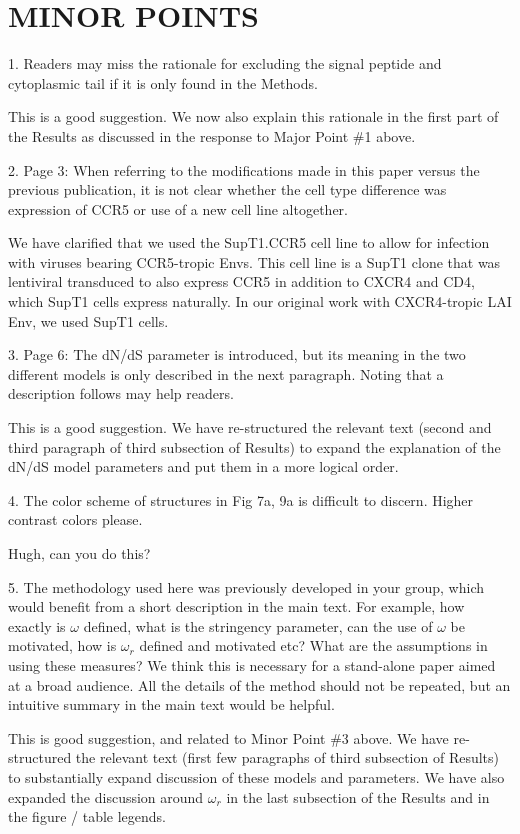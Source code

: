 \documentclass[11pt, oneside]{article}   	%
\begin{document}
\section*{MINOR POINTS}

1. Readers may miss the rationale for excluding the signal peptide and cytoplasmic tail if it is only found in the Methods. 

{\color{black}
This is a good suggestion.
We now also explain this rationale in the first part of the Results as discussed in the response to Major Point \#1 above.}

2. Page 3: When referring to the modifications made in this paper versus the previous publication, it is not clear whether the cell type difference was expression of CCR5 or use of a new cell line altogether. 

{\color{black}
We have clarified that we used the SupT1.CCR5 cell line to allow for infection with viruses bearing CCR5-tropic Envs. This cell line is a SupT1 clone that was lentiviral transduced to also express CCR5 in addition to CXCR4 and CD4, which SupT1 cells express naturally. In our original work with CXCR4-tropic LAI Env, we used SupT1 cells. 
}

3. Page 6: The dN/dS parameter is introduced, but its meaning in the two different models is only described in the next paragraph. Noting that a description follows may help readers. 

{\color{black}
This is a good suggestion.
We have re-structured the relevant text (second and third paragraph of third subsection of Results) to expand the explanation of the dN/dS model parameters and put them in a more logical order.}

4. The color scheme of structures in Fig 7a, 9a is difficult to discern. Higher contrast colors please. 

{\color{red}
Hugh, can you do this?}

5. The methodology used here was previously developed in your group, which would benefit from a short description in the main text. For example, how exactly is $\omega$ defined, what is the stringency parameter, can the use of $\omega$ be motivated, how is $\omega_r$ defined and motivated etc? What are the assumptions in using these measures? We think this is necessary for a stand-alone paper aimed at a broad audience. All the details of the method should not be repeated, but an intuitive summary in the main text would be helpful. 

{\color{black}
This is good suggestion, and related to Minor Point \#3 above.
We have re-structured the relevant text (first few paragraphs of third subsection of Results) to substantially expand discussion of these models and parameters.
We have also expanded the discussion around $\omega_r$ in the last subsection of the Results and in the figure / table legends.}
\end{document}
